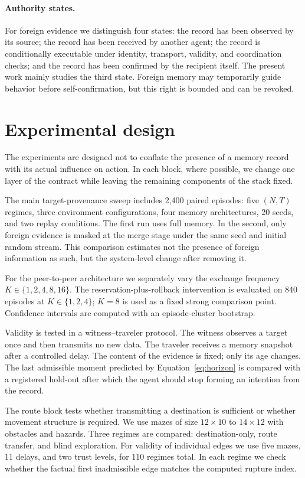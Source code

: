\documentclass{article}
\begin{document}
\paragraph{Authority states.}
For foreign evidence we distinguish four states: the record has been observed by its source; the record has been received by another agent; the record is conditionally executable under identity, transport, validity, and coordination checks; and the record has been confirmed by the recipient itself. The present work mainly studies the third state. Foreign memory may temporarily guide behavior before self-confirmation, but this right is bounded and can be revoked.

\section{Experimental design}

The experiments are designed not to conflate the presence of a memory record with its actual influence on action. In each block, where possible, we change one layer of the contract while leaving the remaining components of the stack fixed.

The main target-provenance sweep includes 2,400 paired episodes: five $(N,T)$ regimes, three environment configurations, four memory architectures, 20 seeds, and two replay conditions. The first run uses full memory. In the second, only foreign evidence is masked at the merge stage under the same seed and initial random stream. This comparison estimates not the presence of foreign information as such, but the system-level change after removing it.

For the peer-to-peer architecture we separately vary the exchange frequency $K\in\{1,2,4,8,16\}$. The reservation-plus-rollback intervention is evaluated on 840 episodes at $K\in\{1,2,4\}$; $K=8$ is used as a fixed strong comparison point. Confidence intervals are computed with an episode-cluster bootstrap.

Validity is tested in a witness--traveler protocol. The witness observes a target once and then transmits no new data. The traveler receives a memory snapshot after a controlled delay. The content of the evidence is fixed; only its age changes. The last admissible moment predicted by Equation~\ref{eq:horizon} is compared with a registered hold-out after which the agent should stop forming an intention from the record.

The route block tests whether transmitting a destination is sufficient or whether movement structure is required. We use mazes of size $12\times 10$ to $14\times 12$ with obstacles and hazards. Three regimes are compared: destination-only, route transfer, and blind exploration. For validity of individual edges we use five mazes, 11 delays, and two trust levels, for 110 regimes total. In each regime we check whether the factual first inadmissible edge matches the computed rupture index.
\end{document}
